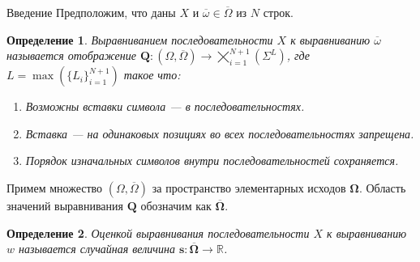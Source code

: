 \documentclass[ucs, notheorems, handout, 10pt]{beamer}
\newtheorem{defenition}{Определение}
\begin{document}
	\begin{frame}{Введение}					
		Предположим, что даны $X$ и $\overline \omega \in \overline{\Omega}$ из $N$ строк. 
		
		\begin{defenition}
			Выравниванием последовательности $X$ к выравниванию $\overline \omega$ называется отображение $\boldsymbol{Q}: (\Omega, \overline{\Omega}) \rightarrow \bigtimes_{i=1}^{N+1}(\Sigma^{L})$, где $L = \max(\{L_i\}_{i=1}^{N+1})$ такое что:
			\begin{enumerate}
				\item Возможны вставки символа --- в последовательностях.
				\item Вставка --- на одинаковых позициях во всех последовательностях запрещена.
				\item Порядок изначальных символов внутри последовательностей сохраняется.
			\end{enumerate}
		\end{defenition}
		
		Примем множество $(\Omega, \overline \Omega)$ за пространство элементарных исходов $\boldsymbol{\Omega}$. Область значений выравнивания $\boldsymbol Q$ обозначим как $\overline{\boldsymbol{\Omega}}$.
		
		\begin{defenition}				
			Оценкой выравнивания последовательности $X$ к выравниванию $w$ называется случайная величина $\boldsymbol s:\overline{\boldsymbol{\Omega}} \rightarrow \mathbb{R}$.
		\end{defenition}				
		
	\end{frame}
\end{document}
